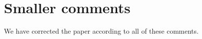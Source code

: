 \documentclass[12pt,english]{scrartcl}
\begin{document}
\section{Smaller comments}
We have corrected the paper according to all of these comments.

% 
% 
\end{document}
